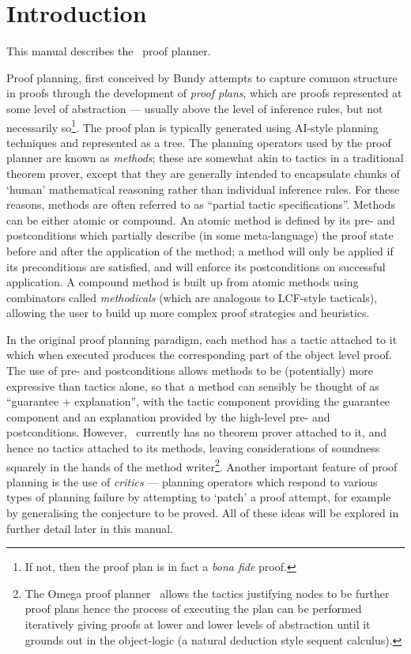 \chapter{Introduction}

This manual describes the \lclam\ proof planner.

Proof planning, first conceived by Bundy \cite{pub349} attempts to
capture common structure in proofs through the development of
\emph{proof plans}, which are proofs represented at some level of
abstraction --- usually above the level of inference rules, but not
necessarily so\footnote{If not, then the proof plan is in fact a
  \emph{bona fide} proof.}.  The proof plan is typically generated
using AI-style planning techniques and represented as a tree.  The
planning operators used by the proof planner are known as
\emph{methods}; these are somewhat akin to tactics in a traditional
theorem prover, except that they are generally intended to encapsulate
chunks of `human' mathematical reasoning rather than individual
inference rules.  For these reasons, methods are often referred to as
``partial tactic specifications''.  Methods can be either atomic or
compound.  An atomic method is defined by its pre- and postconditions
which partially describe (in some meta-language) the proof state
before and after the application of the method; a method will only be
applied if its preconditions are satisfied, and will enforce its
postconditions on successful application.  A compound method is built
up from atomic methods using combinators called \emph{methodicals}
(which are analogous to LCF-style tacticals), allowing the user to
build up more complex proof strategies and heuristics.

In the original proof planning paradigm, each method has a tactic
attached to it which when executed produces the corresponding part of
the object level proof.  The use of pre- and postconditions allows
methods to be (potentially) more expressive than tactics alone, so
that a method can sensibly be thought of as ``guarantee +
explanation'', with the tactic component providing the guarantee
component and an explanation provided by the high-level pre- and
postconditions.  However, \lclam\, currently has no theorem prover
attached to it, and hence no tactics attached to its methods, leaving
considerations of soundness squarely in the hands of the method
writer\footnote{The {\sc Omega} proof
  planner~\cite{omega} allows the tactics justifying nodes to be
  further proof plans hence the process of executing the plan can be
  performed iteratively giving proofs at lower and lower levels of
  abstraction until it grounds out in the object-logic (a natural
  deduction style sequent calculus).}.  Another important feature of
proof planning is the use of \emph{critics} --- planning operators
which respond to various types of planning failure by attempting to
`patch' a proof attempt, for example by generalising the conjecture to
be proved.  All of these ideas will be explored in further detail
later in this manual.

